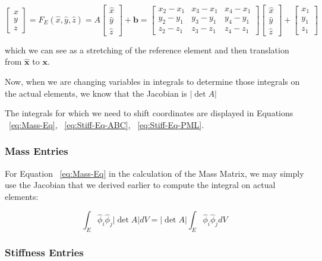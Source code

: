 \begin{equation}
\label{eq:transform}
\begin{bmatrix}
x \\
y \\
z
\end{bmatrix}
= F_E(\hat{x}, \hat{y}, \hat{z}) = A \begin{bmatrix}
\hat{x} \\ 
\hat{y} \\ 
\hat{z}
\end{bmatrix} + \boldsymbol{b}
= \begin{bmatrix}
x_2-x_1 & x_3-x_1 & x_4-x_1 \\
y_2-y_1 & y_3-y_1 & y_4-y_1 \\
z_2-z_1 & z_3-z_1 & z_4-z_1
\end{bmatrix} \begin{bmatrix}
\hat{x} \\
\hat{y} \\
\hat{z}
\end{bmatrix} + \begin{bmatrix}
x_1 \\
y_1 \\
z_1
\end{bmatrix}
\end{equation}

which we can see as a stretching of the reference element and then translation from $\boldsymbol{\hat{x}}$ to $\boldsymbol{x}$.

Now, when we are changing variables in integrals to determine those integrals on the actual elements, we know that the Jacobian is $|\det A|$


The integrals for which we need to shift coordinates are displayed in Equations ~\ref{eq:Mass-Eq}, ~\ref{eq:Stiff-Eq-ABC}, ~\ref{eq:Stiff-Eq-PML}.

\subsubsection{Mass Entries}

For Equation ~\ref{eq:Mass-Eq} in the calculation of the Mass Matrix, we may simply use the Jacobian that we derived earlier to compute the integral on actual elements:

\begin{equation}
\int_E \hat{\phi}_i \hat{\phi}_j |\det A| dV = |\det A| \int_E \hat{\phi}_i \hat{\phi}_j dV 
\end{equation}

\subsubsection{Stiffness Entries}

